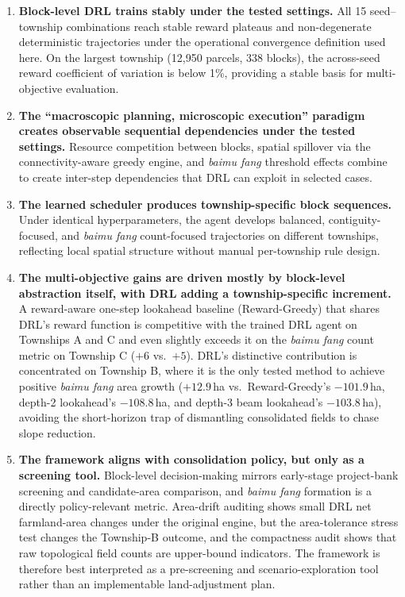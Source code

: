 \documentclass[preprint,12pt]{elsarticle}
\begin{document}
\begin{enumerate}
\item \textbf{Block-level DRL trains stably under the tested settings.} All 15 seed--township combinations reach stable reward plateaus and non-degenerate deterministic trajectories under the operational convergence definition used here. On the largest township (12{,}950 parcels, 338 blocks), the across-seed reward coefficient of variation is below 1\%, providing a stable basis for multi-objective evaluation.

\item \textbf{The ``macroscopic planning, microscopic execution'' paradigm creates observable sequential dependencies under the tested settings.} Resource competition between blocks, spatial spillover via the connectivity-aware greedy engine, and \textit{baimu fang} threshold effects combine to create inter-step dependencies that DRL can exploit in selected cases.

\item \textbf{The learned scheduler produces township-specific block sequences.} Under identical hyperparameters, the agent develops balanced, contiguity-focused, and \textit{baimu fang} count-focused trajectories on different townships, reflecting local spatial structure without manual per-township rule design.

\item \textbf{The multi-objective gains are driven mostly by block-level abstraction itself, with DRL adding a township-specific increment.} A reward-aware one-step lookahead baseline (Reward-Greedy) that shares DRL's reward function is competitive with the trained DRL agent on Townships A and C and even slightly exceeds it on the \textit{baimu fang} count metric on Township C ($+6$ vs.\ $+5$). DRL's distinctive contribution is concentrated on Township B, where it is the only tested method to achieve positive \textit{baimu fang} area growth ($+12.9$\,ha vs.\ Reward-Greedy's $-101.9$\,ha, depth-2 lookahead's $-108.8$\,ha, and depth-3 beam lookahead's $-103.8$\,ha), avoiding the short-horizon trap of dismantling consolidated fields to chase slope reduction.

\item \textbf{The framework aligns with consolidation policy, but only as a screening tool.} Block-level decision-making mirrors early-stage project-bank screening and candidate-area comparison, and \textit{baimu fang} formation is a directly policy-relevant metric. Area-drift auditing shows small DRL net farmland-area changes under the original engine, but the area-tolerance stress test changes the Township-B outcome, and the compactness audit shows that raw topological field counts are upper-bound indicators. The framework is therefore best interpreted as a pre-screening and scenario-exploration tool rather than an implementable land-adjustment plan.
\end{enumerate}
\end{document}
